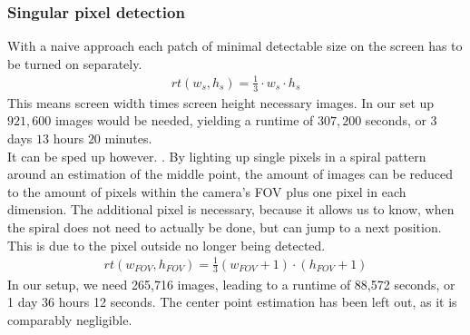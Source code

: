 \documentclass[journal,final,a4paper,twoside]{PS}
\begin{document}
\subsubsection{Singular pixel detection}
\label{singlePixel}
With a naive approach each patch of minimal detectable size on the screen has to be turned on separately.
\begin{align}
rt(w_s, h_s) = \frac{1}{3} \cdot w_s \cdot h_s
\end{align}
This means screen width times screen height necessary images. In our set up $921,600$ images would be needed, yielding a runtime of $307,200$ seconds, or $3$ days $13$ hours $20$ minutes.\\
It can be sped up however. . By lighting up single pixels in a spiral pattern around an estimation of the middle point, the amount of images can be reduced to the amount of pixels within the camera’s FOV plus one pixel in each dimension. The additional pixel is necessary, because it allows us to know, when the spiral does not need to actually be done, but can jump to a next position. This is due to the pixel outside no longer being detected. \begin{align}
rt(w_{FOV}, h_{FOV}) = \frac{1}{3} (w_{FOV} + 1) \cdot (h_{FOV} + 1)
\end{align}
In our setup, we need 265,716 images, leading to a runtime of 88,572 seconds, or 1 day 36 hours 12  seconds. The center point estimation has been left out, as it is comparably negligible.\\
	
\end{document}
